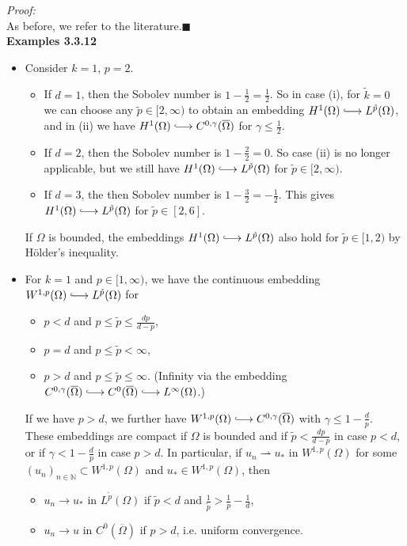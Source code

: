 \textit{Proof:}\\
As before, we refer to the literature.\hfill$\blacksquare$\\[11pt]

\textbf{Examples 3.3.12}
\begin{itemize}
	\item[(a)] Consider $k=1$, $p=2$.
	\begin{itemize}
		\item[(1)] If $d=1$, then the Sobolev number is $1-\frac{1}{2}=\frac{1}{2}$. So in case (i), for $\tilde{k}=0$ we can choose any $\tilde{p}\in[2,\infty)$ to obtain an embedding $H^1(\Omega)\longhookrightarrow L^{\tilde{p}}(\Omega)$, and in (ii) we have $H^1(\Omega)\longhookrightarrow C^{0,\gamma}(\overline{\Omega})$ for $\gamma\leq\frac{1}{2}$.
		\item[(2)] If $d=2$, then the Sobolev number is $1-\frac{2}{2}=0$. So case (ii) is no longer applicable, but we still have $H^1(\Omega)\longhookrightarrow L^{\tilde{p}}(\Omega)$ for $\tilde{p}\in[2,\infty)$.
		\item[(3)] If $d=3$, the then Sobolev number is $1-\frac{3}{2}=-\frac{1}{2}$. This gives $H^1(\Omega)\longhookrightarrow L^{\tilde{p}}(\Omega)$ for $\tilde{p}\in[2,6]$.
	\end{itemize}
	If $\Omega$ is bounded, the embeddings $H^1(\Omega)\longhookrightarrow L^{\tilde{p}}(\Omega)$ also hold for $\tilde{p}\in[1,2)$ by H\"older's inequality.
	\item[(b)] For $k=1$ and $p\in[1,\infty)$, we have the continuous embedding $W^{1,p}(\Omega)\longhookrightarrow L^{\tilde{p}}(\Omega)$ for
	\begin{itemize}
		\item[(1)] $p<d$ and $p\leq\tilde{p}\leq\frac{dp}{d-p}$,
		\item[(2)] $p=d$ and $p\leq\tilde{p}<\infty$,
		\item[(3)] $p>d$ and $p\leq\tilde{p}\leq\infty$. (Infinity via the embedding $C^{0,\gamma}(\overline{\Omega})\longhookrightarrow C^0(\overline{\Omega})\longhookrightarrow L^\infty(\Omega)$.)
	\end{itemize}
	If we have $p>d$, we further have $W^{1,p}(\Omega)\longhookrightarrow C^{0,\gamma}(\overline{\Omega})$ with $\gamma\leq1-\frac{d}{p}$.\\

	These embeddings are compact if $\Omega$ is bounded and if $\tilde{p}<\frac{dp}{d-p}$ in case $p<d$, or if $\gamma<1-\frac{d}{p}$ in case $p>d$. In particular, if $u_n\rightharpoonup u_*$ in $W^{1,p}(\Omega)$ for some $(u_n)_{n\in\mathbb{N}}\subset W^{1,p}(\Omega)$ and $u_*\in W^{1,p}(\Omega)$, then
	\begin{itemize}
		\item[(i)] $u_n\to u_*$ in $L^{\tilde{p}}(\Omega)$ if $\tilde{p}<d$ and $\frac{1}{\tilde{p}}>\frac{1}{p}-\frac{1}{d}$,
		\item[(ii)] $u_n\to u$ in $C^0(\overline{\Omega})$ if $p>d$, i.e. uniform convergence.\\[11pt]
	\end{itemize}
\end{itemize}

